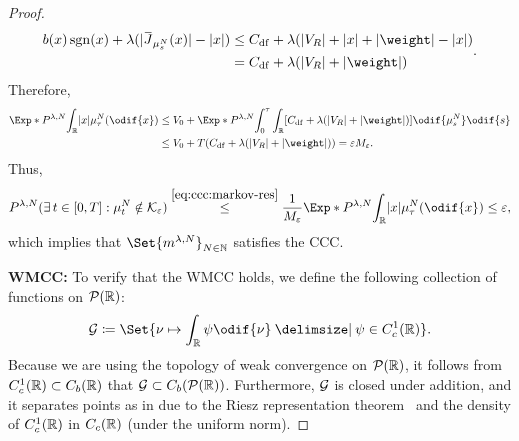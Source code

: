 \begin{proof}
\begin{equation}
\begin{split}
    b(x) \sgn(x) + \lambda (\abs{\ol{J}_{\mu_{s}^N}(x)} - \abs{x})
    &\leq C_\mathrm{df} + \lambda (\abs{V_R} + \abs{x} + \abs{\weight} - \abs{x}) \\
    &= C_\mathrm{df} + \lambda (\abs{V_R} + \abs{\weight})
    \end{split}.
  \end{equation}
  Therefore,
  \begin{equation}
    \begin{split}
    \Exp*{P^{\lambda, N}}{\int_\potspace \abs{x} \mu_\tau^N(\odif{x})}
    &\leq V_0 + \Exp*{P^{\lambda, N}}{\int_0^\tau \int_\potspace \sbr{ C_\mathrm{df} + \lambda (\abs{V_R} + \abs{\weight}) } \odif{\mu_{s}^N} \odif{s} } \\
    &\leq V_0 + T ( C_\mathrm{df} + \lambda (\abs{V_R} + \abs{\weight}) ) = \eps M_\eps.
    \end{split}
  \end{equation}
  Thus,
  \begin{equation}
    P^{\lambda, N} (\exists t \in [0,T] : \mu_t^N \notin \cK_\eps) \overset{\eqref{eq:ccc:markov-res}}{\leq}
    \frac{1}{M_\eps} \Exp*{P^{\lambda, N}}{\int_\potspace \abs{x} \mu_\tau^N(\odif{x})}
    \leq \eps,
  \end{equation}
  which implies that \( \Set{\lawmu^{\lambda,N}}_{N \in \bN} \) satisfies the CCC.

  \bigskip

  \textbf{WMCC:}
  To verify that the WMCC holds, we define the following collection of functions on \(\mathcal{P}(\mathbb{R})\):
  \begin{equation}
    \cG \coloneqq \Set{\nu \mapsto \int_\potspace \psi \odif{\nu} \given \psi \in C_c^1(\potspace)}.
  \end{equation}
  Because we are using the topology of weak convergence on \(\mathcal{P}(\mathbb{R})\), it follows from \(C_c^1(\mathbb{R}) \subset C_b(\mathbb{R})\) that \(\mathcal{G} \subset C_b(\mathcal{P}(\mathbb{R}))\).
  Furthermore, \( \mathcal{G} \) is closed under addition, and it separates points as in  due to the Riesz representation theorem~\cite[Thm. 2.14]{rudinRealComplexAnalysis2013} and the density of \( C_c^1(\mathbb{R}) \) in \( C_c(\mathbb{R}) \) (under the uniform norm).


\end{proof}
